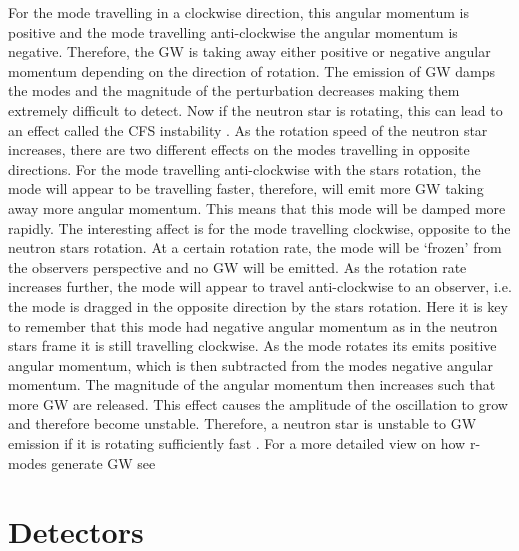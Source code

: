 For the mode travelling in a clockwise direction, this angular momentum is positive and the mode travelling anti-clockwise the angular momentum is negative. 
Therefore, the \gls{GW} is taking away either positive or negative angular momentum depending on the direction of rotation.
The emission of \gls{GW} damps the modes and the magnitude of the perturbation decreases making them extremely difficult to detect.
Now if the neutron star is rotating, this can lead to an effect called the \gls{CFS} instability  \citep{chandrasekhar1970SolutionsTwo,friedman1978SecularInstability}. 
As the rotation speed of the neutron star increases, there are two different effects on the modes travelling in opposite directions. 
For the mode travelling anti-clockwise with the stars rotation, the mode will appear to be travelling faster, therefore, will emit more \gls{GW} taking away more angular momentum. This means that this mode will be damped more rapidly.
The interesting affect is for the mode travelling clockwise, opposite to the neutron stars rotation. 
At a certain rotation rate, the mode will be `frozen' from the observers perspective and no \gls{GW} will be emitted.
As the rotation rate increases further, the mode will appear to travel anti-clockwise to an observer, i.e. the mode is dragged in the opposite direction by the stars rotation. 
Here it is key to remember that this mode had negative angular momentum as in the neutron stars frame it is still travelling clockwise.
As the mode rotates its emits positive angular momentum, which is then subtracted from the modes negative angular momentum.
The magnitude of the angular momentum then increases such that more \gls{GW} are released.
This effect causes the amplitude of the oscillation to grow and therefore become unstable.
Therefore, a neutron star is unstable to \gls{GW} emission if it is rotating sufficiently fast \citep{lasky2015GravitationalWaves}.
For a more detailed view on how r-modes generate \gls{GW} see \citep{owen1998GravitationalWaves,jonesCFSInstability}


\section{\label{intro:detector}Detectors}

